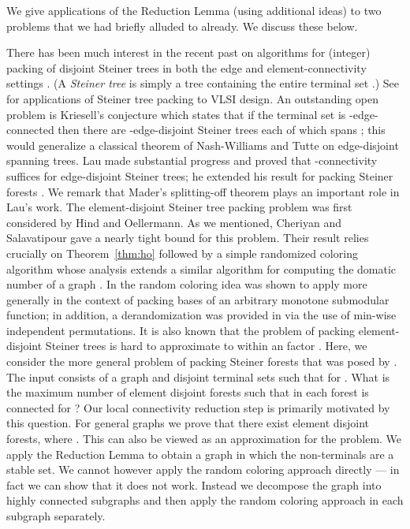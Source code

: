 \documentclass[11pt]{article}
\begin{document}
We give applications of the Reduction Lemma (using additional ideas)
to two problems that we had briefly alluded to already. We discuss
these below.

\smallskip
{} 
There has been much interest in the recent past on algorithms for
(integer) packing of disjoint Steiner trees in both the edge and
element-connectivity settings
\cite{Kriesell,JainMS03,Lau1,Lau2,CheriyanS04,cs,ChekuriS}. (A
\emph{Steiner tree} is simply a tree containing the entire terminal
set .) See \cite{GrotschelMW97} for applications of Steiner tree
packing to VLSI design. An outstanding open problem is Kriesell's
conjecture which states that if the terminal set  is
-edge-connected then there are -edge-disjoint Steiner trees
each of which spans ; this would generalize a classical theorem of
Nash-Williams and Tutte on edge-disjoint spanning trees. Lau made
substantial progress \cite{Lau1} and proved that -connectivity
suffices for  edge-disjoint Steiner trees; he extended his result
for packing Steiner forests \cite{Lau2}.  We remark that Mader's
splitting-off theorem plays an important role in Lau's work. The
element-disjoint Steiner tree packing problem was first considered by
Hind and Oellermann. As we mentioned, Cheriyan and Salavatipour
\cite{cs} gave a nearly tight bound for this problem. Their result relies
crucially on Theorem~\ref{thm:ho} followed by a simple randomized
coloring algorithm whose analysis extends a similar algorithm for
computing the domatic number of a graph \cite{FeigeHKS00}. In
\cite{CalinescuCV07} the random coloring idea was shown to apply more
generally in the context of packing bases of an arbitrary monotone
submodular function; in addition, a derandomization was provided in
\cite{CalinescuCV07} via the use of min-wise independent
permutations. It is also known that the problem of packing
element-disjoint Steiner trees is hard to approximate to within an
 factor \cite{CheriyanS04}. Here, we consider the more
general problem of packing Steiner forests that was posed by
\cite{cs}.  The input consists of a graph  and disjoint
terminal sets  such that  for .  What is the maximum number of element
disjoint forests such that in each forest  is connected for ? Our local connectivity reduction step is primarily
motivated by this question.  For general graphs we prove that there
exist  element disjoint forests, where . This can also be viewed as an 
approximation for the problem. We apply the Reduction Lemma to obtain
a graph in which the non-terminals are a stable set. We cannot however
apply the random coloring approach directly --- in fact we can show
that it does not work. Instead we decompose the graph into highly
connected subgraphs and then apply the random coloring approach in
each subgraph separately.
\end{document}
